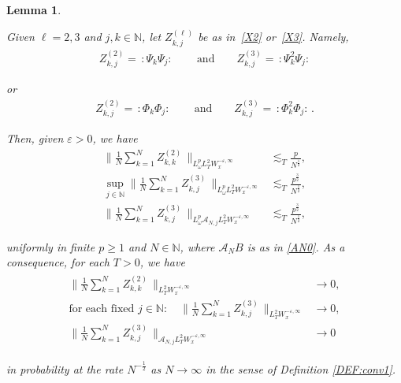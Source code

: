 \documentclass[10pt,a4paper]{amsart}
\newtheorem{lemma}{Lemma}
\newcommand{\A}{\mathcal{A}}
\newcommand{\N}{\mathbb{N}}
\newcommand{\eps}{\varepsilon}
\renewcommand{\l}{\ell}
\newcommand{\les}{\lesssim}
\newcommand{\noi}{\noindent}
\renewcommand{\o}{\omega}
\newcommand{\too}{\longrightarrow}
\newcommand{\wick}[1]{:\!{#1}\!:}
\begin{document}
\begin{lemma}
\label{LEM:LLN1}


Given $\l = 2, 3$ and $j, k \in \N$, 
let $Z^{(\l)}_{k, j}$
be as in~\eqref{X2} or~\eqref{X3}.
Namely, 
\begin{align}
  Z_{k, j}^{(2)} = \, \wick{\Psi_k \Psi_j} \,  
\qquad \text{and}\qquad 
Z_{k, j}^{(3)}
=  \, \wick{\Psi_k^2 \Psi_j} 
\label{LN1}
\end{align}

\noi
or 
\begin{align}
   Z_{k, j}^{(2)} = \, \wick{\Phi_k \Phi_j} \, 
\qquad \text{and}\qquad 
Z_{k, j}^{(3)}
=  \, \wick{\Phi_k^2 \Phi_j}\,.
\label{LN2}
\end{align}


\noi
Then, 
given $\eps > 0$, we have 
\begin{align}
 \bigg\| \frac{1}{N} \sum_{k = 1}^N 
Z_{k, k}^{(2)}\, \bigg\|_{L^p_\o L_T^2 W_x^{- \eps, \infty}}
& \les_T \frac{p}{N^{\frac 12}} , 
\label{LN3} \\
\sup_{j \in \N}
 \bigg\| \frac 1N \sum_{k = 1}^N 
 Z_{k, j}^{(3)}\, \bigg\|_{L^p_\o L_T^2 W_x^{- \eps, \infty}}
& \les_T \frac{p^{\frac 32} }{N^{\frac 12}} , 
\label{LN4} \\
 \bigg\| \frac 1N \sum_{k = 1}^N 
 Z_{k, j}^{(3)}\, \bigg\|_{L^p_\o \A_{N, j}L_T^2 W_x^{- \eps, \infty}}
& \les_T \frac{p^{\frac 32} }{N^{\frac 12}} , 
\label{LN5}
\end{align}

\noi
uniformly in finite $p \ge 1$ and $N \in \N$, 
where $\A_N B$ is as in \eqref{AN0}.
As a consequence,
for each $T > 0$, we have 
\begin{align}
\begin{split}
 \bigg\| \frac{1}{N} \sum_{k = 1}^N 
Z_{k, k}^{(2)}\, \bigg\|_{ L_T^2 W_x^{- \eps, \infty}}
& \too 0 , \\
\text{for each fixed $j \in \N:$}
\quad 
  \bigg\| \frac 1N \sum_{k = 1}^N 
 Z_{k, j}^{(3)}\, \bigg\|_{ L_T^2 W_x^{- \eps, \infty}}
& \too 0 , \\
  \bigg\| \frac 1N \sum_{k = 1}^N 
 Z_{k, j}^{(3)}\, \bigg\|_{ \A_{N, j}L_T^2 W_x^{- \eps, \infty}}
& \too 0
\end{split}
\label{LN5a}
\end{align}

\noi
in probability
at the rate $N^{-\frac 12 }$
as $N \to \infty$
in the sense of Definition \ref{DEF:conv1}.


\end{lemma}
\end{document}
